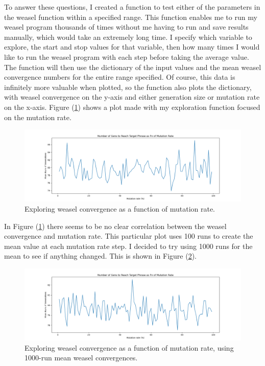 \documentclass[12pt, letterpaper]{article}
\begin{document}
To answer these questions, I created a function to test either of the parameters in the weasel function within a specified range. This function enables me to run my weasel program thousands of times without me having to run and save results manually, which would take an extremely long time. I specify which variable to explore, the start and stop values for that variable, then how many times I would like to run the weasel program with each step before taking the average value. The function will then use the dictionary of the input values and the mean weasel convergence numbers for the entire range specified. Of course, this data is infinitely more valuable when plotted, so the function also plots the dictionary, with weasel convergence on the y-axis and either generation size or mutation rate on the x-axis. Figure (\ref{fig:varmut}) shows a plot made with my exploration function focused on the mutation rate.

\begin{figure}[!ht]
  \centering
  \includegraphics[width=12cm]{../plots/Mut_mean_100_1_to_100.png}
  \caption{Exploring weasel convergence as a function of mutation rate.}
  \label{fig:varmut}
\end{figure}


In Figure (\ref{fig:varmut}) there seems to be no clear correlation between the weasel convergence and mutation rate. This particular plot uses 100 runs to create the mean value at each mutation rate step. I decided to try using 1000 runs for the mean to see if anything changed. This is shown in Figure (\ref{fig:varmut1000}).

\begin{figure}[!ht]
  \centering
  \includegraphics[width=12cm]{../plots/Mut_mean_1000_1_to_100.png}
  \caption{Exploring weasel convergence as a function of mutation rate, using 1000-run mean weasel convergences.}
  \label{fig:varmut1000}
\end{figure}
\end{document}
